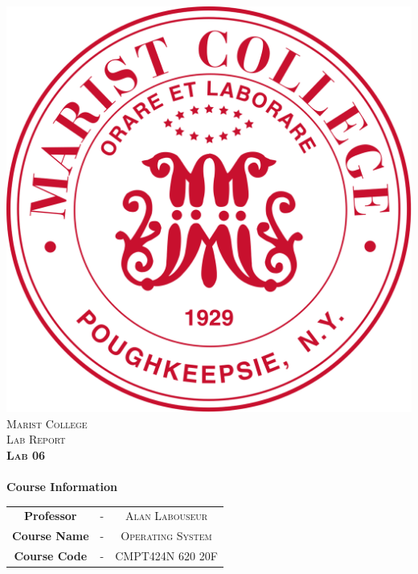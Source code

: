 \includegraphics[scale=0.15]{edit/logo.png}\\[1cm] %

\textsc{\LARGE Marist College}\\[1.5cm] %
\textsc{\Large Lab Report}\\[0.5cm]
\textsc{\Large \textbf{Lab 06}}\\[0.5cm]

\HRule \\[0.6cm]
{\Large\bfseries Course Information}\\[0.4cm] %
\begin{tabular}{c c c}
\large{\bfseries Professor} & - & \large{\textsc{Alan Labouseur}}\\ %
\large{\bfseries Course Name} & - & \large{\textsc{Operating System}}\\ %
\large{\bfseries Course Code} & - & \large{\textsc{CMPT424N 620 20F}}\\[7mm] %
\end{tabular}
\HRule \\[1.5cm]
